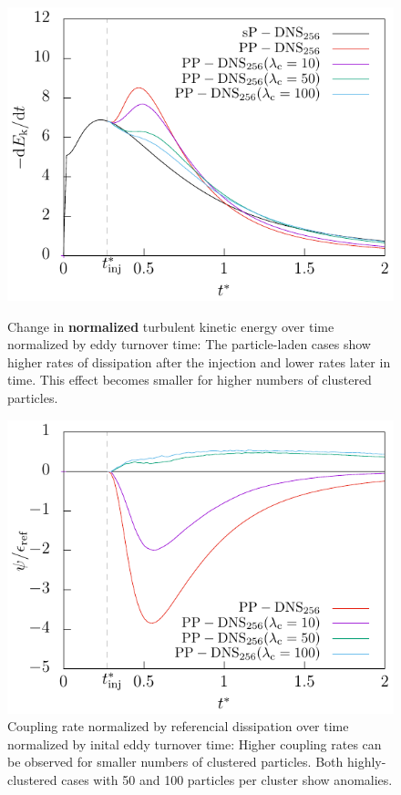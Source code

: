 \documentclass[11pt,a4paper,openany,oneside,parskip=half*]{article}
\begin{document}
\begin{figure}[h]
    \centering
    \begin{minipage}{.5\textwidth}
        \centering
        \includegraphics[width=\linewidth]{./Abbildungen/256/der(kineticEnergy)_time.pdf}
        \caption{Change in \textbf{normalized} turbulent kinetic energy over time normalized by eddy turnover time: The particle-laden cases  show higher rates of dissipation after the injection and lower rates later in time. This effect becomes smaller for higher numbers of clustered particles.}
        \label{der(kineticEnergy)_time_128}
    \end{minipage}%
    \begin{minipage}{0.5\textwidth}
        \centering
        \includegraphics[width=\linewidth]{./Abbildungen/256/coupling_time.pdf}
        \caption{Coupling rate normalized by referencial dissipation over time normalized by inital eddy turnover time: Higher coupling rates can be observed for smaller numbers of clustered particles. Both highly-clustered cases with 50 and 100 particles per cluster show anomalies.}
        \label{coupling_time_128}
    \end{minipage}
\end{figure}
\end{document}
